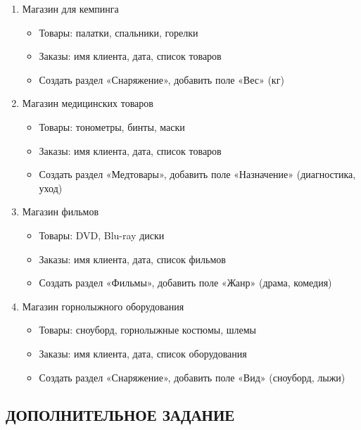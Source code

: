 \documentclass[12pt]{article}
\begin{document}
\begin{enumerate}
	\item Магазин для кемпинга
	      \begin{itemize}
		      \item Товары: палатки, спальники, горелки
		      \item Заказы: имя клиента, дата, список товаров
		      \item Создать раздел «Снаряжение», добавить поле «Вес» (кг)
	      \end{itemize}

	\item Магазин медицинских товаров
	      \begin{itemize}
		      \item Товары: тонометры, бинты, маски
		      \item Заказы: имя клиента, дата, список товаров
		      \item Создать раздел «Медтовары», добавить поле «Назначение» (диагностика, уход)
	      \end{itemize}

	      \newpage

	\item Магазин фильмов
	      \begin{itemize}
		      \item Товары: DVD, Blu-ray диски
		      \item Заказы: имя клиента, дата, список фильмов
		      \item Создать раздел «Фильмы», добавить поле «Жанр» (драма, комедия)
	      \end{itemize}

	\item Магазин горнолыжного оборудования
	      \begin{itemize}
		      \item Товары: сноуборд, горнолыжные костюмы, шлемы
		      \item Заказы: имя клиента, дата, список оборудования
		      \item Создать раздел «Снаряжение», добавить поле «Вид» (сноуборд, лыжи)
	      \end{itemize}

\end{enumerate}

\subsection{ДОПОЛНИТЕЛЬНОЕ ЗАДАНИЕ ~\texorpdfstring{\faLightbulb\ }{}}\label{sect:task}
\end{document}
